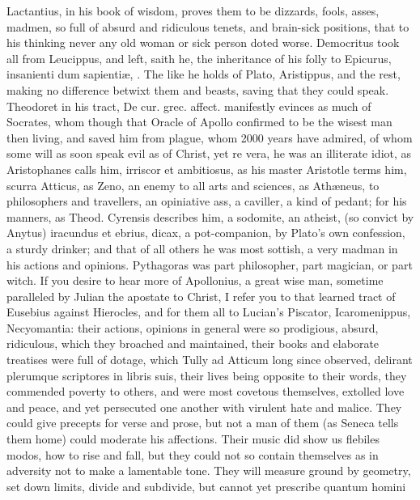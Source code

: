 {Lactantius, in his book of wisdom, proves them to be dizzards,
fools, asses, madmen, so full of absurd and ridiculous tenets, and
brain-sick positions, that to his thinking never any old woman or sick
person doted worse. Democritus took all from Leucippus, and left,
saith he, the inheritance of his folly to Epicurus, insanienti dum
sapienti\ae{}, \etc. The like he holds of Plato, Aristippus, and the rest,
making no difference betwixt them and beasts, saving that they
could speak. Theodoret in his tract, De cur. grec. affect.
manifestly evinces as much of Socrates, whom though that Oracle of
Apollo confirmed to be the wisest man then living, and saved him from
plague, whom 2000 years have admired, of whom some will as soon speak
evil as of Christ, yet re vera, he was an illiterate idiot, as
Aristophanes calls him, irriscor et ambitiosus, as his master
Aristotle terms him, scurra Atticus, as Zeno, an enemy to all arts
and sciences, as Ath\ae{}neus, to philosophers and travellers, an
opiniative ass, a caviller, a kind of pedant; for his manners, as
Theod. Cyrensis describes him, a  sodomite, an atheist, (so
convict by Anytus) iracundus et ebrius, dicax, \etc a pot-companion, by
Plato's own confession, a sturdy drinker; and that of all others
he was most sottish, a very madman in his actions and opinions.
Pythagoras was part philosopher, part magician, or part witch. If you
desire to hear more of Apollonius, a great wise man, sometime
paralleled by Julian the apostate to Christ, I refer you to that
learned tract of Eusebius against Hierocles, and for them all to
Lucian's Piscator, Icaromenippus, Necyomantia: their actions, opinions
in general were so prodigious, absurd, ridiculous, which they broached
and maintained, their books and elaborate treatises were full of
dotage, which Tully ad Atticum long since observed, delirant plerumque
scriptores in libris suis, their lives being opposite to their words,
they commended poverty to others, and were most covetous themselves,
extolled love and peace, and yet persecuted one another with virulent
hate and malice. They could give precepts for verse and prose, but not
a man of them (as Seneca tells them home) could moderate his
affections. Their music did show us flebiles modos, \etc how to rise and
fall, but they could not so contain themselves as in adversity not to
make a lamentable tone. They will measure ground by geometry, set down
limits, divide and subdivide, but cannot yet prescribe quantum homini
}
